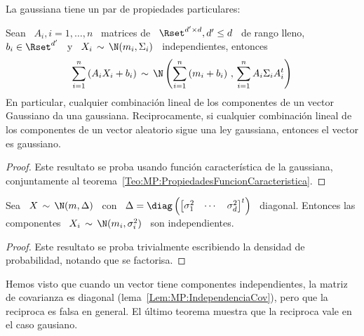 La gaussiana tiene un par de propiedades particulares:
%
\begin{teorema}[Stabilidad]
\label{Teo:MP:StabilidadGaussiana}
%
  Sean \ $A_i , i = 1,\ldots,n$ \  matrices de \ $\Rset^{d' \times d}, d' \le d$
  \ de rango lleno, $b_i \in \Rset^{d'}$ \ y \ $X_i \, \sim \, \N(m_i,\Sigma_i)$
  \ independientes, entonces
  \[
  \sum_{i=1}^n \left(  A_i X_i  + b_i \right)  \, \sim \,  \N\left( \sum_{i=1}^n
    \left( m_i + b_i \right) \, , \, \sum_{i=1}^n A_i \Sigma_i A_i^t \right)
  \]
  En particular, cualquier combinaci\'on lineal  de los componentes de un vector
  Gaussiano da una gaussiana.  Reciprocamente, si cualquier combinaci\'on lineal
  de los componentes de un vector aleatorio sigue una ley gaussiana, entonces el
  vector es gaussiano.
\end{teorema}
%
\begin{proof}
  Este  resultato se proba  usando funci\'on  caracter\'istica de  la gaussiana,
  conjuntamente al teorema~\ref{Teo:MP:PropiedadesFuncionCaracteristica}.
\end{proof}
%
\begin{teorema}[Independencia]
\label{Teo:MP:IndependenciaGaussiana}
%
  Sea   \   $X  \,   \sim   \,   \N(m,\Delta)$  \   con   \   $\Delta  =   \diag
  \left(  \begin{bmatrix}  \sigma_1^2  &  \cdots  &  \sigma_d^2  \end{bmatrix}^t
  \right)$   \  diagonal.   Entonces  las   componentes  \   $X_i  \,   \sim  \,
  \N(m_i,\sigma_i^2)$ \ son independientes.
\end{teorema}
%
\begin{proof}
  Este resultato se proba  trivialmente escribiendo la densidad de probabilidad,
  notando que se factorisa.
\end{proof}
%
Hemos visto que cuando un  vector tiene componentes independientes, la matriz de
covarianza  es   diagonal  (lema~\ref{Lem:MP:IndependenciaCov}),  pero   que  la
reciproca es falsa en general. El \'ultimo teorema muestra que la reciproca vale
en el caso gausiano.

